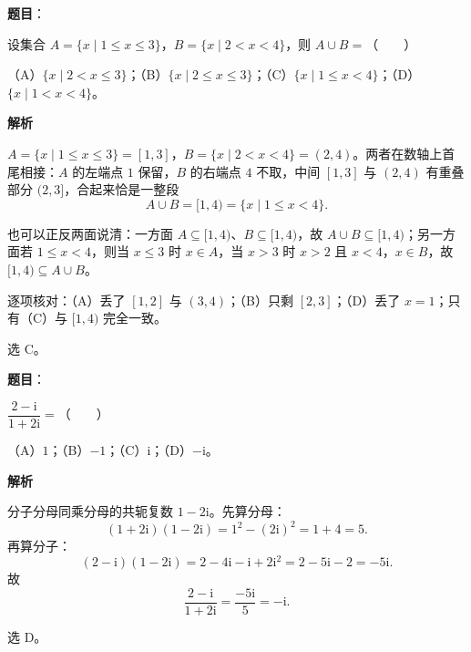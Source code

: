 

\begin{answer}

\textbf{题目}：

设集合 $A=\{x\mid 1\leqslant x\leqslant 3\}$，$B=\{x\mid 2<x<4\}$，则 $A\cup B=$\mbox{（　　）}

（A）$\{x\mid 2<x\leqslant 3\}$；（B）$\{x\mid 2\leqslant x\leqslant 3\}$；（C）$\{x\mid 1\leqslant x<4\}$；（D）$\{x\mid 1<x<4\}$。

\textbf{解析}

$A=\{x\mid1\leqslant x\leqslant3\}=[1,3]$，$B=\{x\mid2<x<4\}=(2,4)$。两者在数轴上首尾相接：$A$ 的左端点 $1$ 保留，$B$ 的右端点 $4$ 不取，中间 $[1,3]$ 与 $(2,4)$ 有重叠部分 $(2,3]$，合起来恰是一整段
\nopagebreak[4]
\[A\cup B=[1,4)=\{x\mid1\leqslant x<4\}.\]

也可以正反两面说清：一方面 $A\subseteq[1,4)$、$B\subseteq[1,4)$，故 $A\cup B\subseteq[1,4)$；另一方面若 $1\leqslant x<4$，则当 $x\leqslant3$ 时 $x\in A$，当 $x>3$ 时 $x>2$ 且 $x<4$，$x\in B$，故 $[1,4)\subseteq A\cup B$。

逐项核对：（A）丢了 $[1,2]$ 与 $(3,4)$；（B）只剩 $[2,3]$；（D）丢了 $x=1$；只有（C）与 $[1,4)$ 完全一致。

选 C。

\gkanswer{答案：C。$A=[1,3]$，$B=(2,4)$，并集为 $[1,4)$，即 $\{x\mid1\leqslant x<4\}$。}

\end{answer}
\begin{answer}

\textbf{题目}：

$\dfrac{2-\mathrm i}{1+2\mathrm i}=$\mbox{（　　）}

（A）$1$；（B）$-1$；（C）$\mathrm i$；（D）$-\mathrm i$。

\textbf{解析}

分子分母同乘分母的共轭复数 $1-2\mathrm i$。先算分母：
\nopagebreak[4]
\[(1+2\mathrm i)(1-2\mathrm i)=1^2-(2\mathrm i)^2=1+4=5 .\]
再算分子：
\nopagebreak[4]
\[(2-\mathrm i)(1-2\mathrm i)=2-4\mathrm i-\mathrm i+2\mathrm i^2=2-5\mathrm i-2=-5\mathrm i .\]
故
\nopagebreak[4]
\[\frac{2-\mathrm i}{1+2\mathrm i}=\frac{-5\mathrm i}{5}=-\mathrm i .\]

选 D。


\end{answer}

